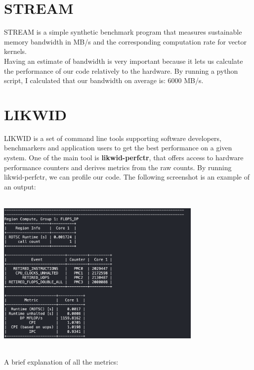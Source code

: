 \documentclass[11pt,a4paper,oneside,titlepage,openright]{book}
\begin{document}
\section{STREAM} 
STREAM is a simple synthetic benchmark program that measures sustainable memory bandwidth in MB/s and the corresponding computation rate for  vector kernels. \\
 Having an estimate of bandwidth is very important because it lets us calculate the performance of our code relatively to the hardware. 
By running a python script, I calculated that our bandwidth on average is: 6000 MB/s.


\section{LIKWID}
LIKWID is a set of command line tools supporting software developers, benchmarkers and application users to get the best performance on a given system.
One of the main tool is \textbf{likwid-perfctr}, that offers access to hardware performance counters and derives metrics from the raw counts. 
By running likwid-perfctr, we can profile our code. The following screenshot is an example of an output: 

\begin{center}
\includegraphics[width=10cm, height=8cm]{scree_lik_perf}
\end{center}

A brief explanation of all the metrics: 
\end{document}
